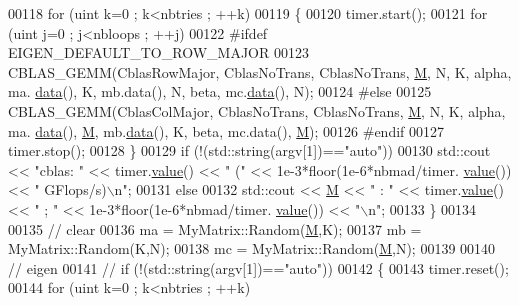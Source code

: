 \begin{DoxyCode}
{{{00118     \textcolor{keywordflow}{for} (uint k=0 ; k<nbtries ; ++k)
00119     \{
00120         timer.start();
00121         \textcolor{keywordflow}{for} (uint j=0 ; j<nbloops ; ++j)
00122               #ifdef EIGEN\_DEFAULT\_TO\_ROW\_MAJOR
00123               CBLAS\_GEMM(CblasRowMajor, CblasNoTrans, CblasNoTrans, \hyperlink{group___core___module_class_eigen_1_1_matrix}{M}, N, K, alpha, ma.
      \hyperlink{class_eigen_1_1_plain_object_base_ac25699535374b1854cf8494e44ad31b2}{data}(), K, mb.data(), N, beta, mc.\hyperlink{class_eigen_1_1_plain_object_base_ac25699535374b1854cf8494e44ad31b2}{data}(), N);
00124 \textcolor{preprocessor}{              #else}
00125               CBLAS\_GEMM(CblasColMajor, CblasNoTrans, CblasNoTrans, \hyperlink{group___core___module_class_eigen_1_1_matrix}{M}, N, K, alpha, ma.
      \hyperlink{class_eigen_1_1_plain_object_base_ac25699535374b1854cf8494e44ad31b2}{data}(), \hyperlink{group___core___module_class_eigen_1_1_matrix}{M}, mb.\hyperlink{class_eigen_1_1_plain_object_base_ac25699535374b1854cf8494e44ad31b2}{data}(), K, beta, mc.data(), \hyperlink{group___core___module_class_eigen_1_1_matrix}{M});
00126 \textcolor{preprocessor}{              #endif}
00127         timer.stop();
00128     \}
00129     \textcolor{keywordflow}{if} (!(std::string(argv[1])==\textcolor{stringliteral}{"auto"}))
00130       std::cout << \textcolor{stringliteral}{"cblas: "} << timer.\hyperlink{class_eigen_1_1_bench_timer_a26760f963ed8b64c126159bfea57735e}{value}() << \textcolor{stringliteral}{" ("} << 1e-3*floor(1e-6*nbmad/timer.
      \hyperlink{class_eigen_1_1_bench_timer_a26760f963ed8b64c126159bfea57735e}{value}()) << \textcolor{stringliteral}{" GFlops/s)\(\backslash\)n"};
00131     \textcolor{keywordflow}{else}
00132         std::cout << \hyperlink{group___core___module_class_eigen_1_1_matrix}{M} << \textcolor{stringliteral}{" : "} << timer.\hyperlink{class_eigen_1_1_bench_timer_a26760f963ed8b64c126159bfea57735e}{value}() << \textcolor{stringliteral}{" ; "} << 1e-3*floor(1e-6*nbmad/timer.
      \hyperlink{class_eigen_1_1_bench_timer_a26760f963ed8b64c126159bfea57735e}{value}()) << \textcolor{stringliteral}{"\(\backslash\)n"};
00133   \}
00134 
00135   \textcolor{comment}{// clear}
00136   ma = MyMatrix::Random(\hyperlink{group___core___module_class_eigen_1_1_matrix}{M},K);
00137   mb = MyMatrix::Random(K,N);
00138   mc = MyMatrix::Random(\hyperlink{group___core___module_class_eigen_1_1_matrix}{M},N);
00139 
00140   \textcolor{comment}{// eigen}
00141 \textcolor{comment}{//   if (!(std::string(argv[1])=="auto"))}
00142   \{
00143       timer.reset();
00144       \textcolor{keywordflow}{for} (uint k=0 ; k<nbtries ; ++k)
}}}
\end{DoxyCode}
